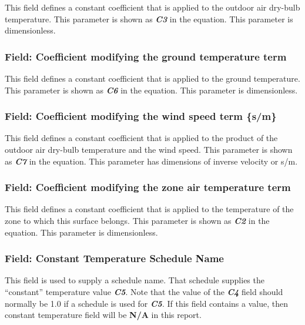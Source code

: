 This field defines a constant coefficient that is applied to the outdoor air dry-bulb temperature. This parameter is shown as \textbf{\emph{C3}} in the equation. This parameter is dimensionless.

\subsubsection{Field: Coefficient modifying the ground temperature term}\label{field-coefficient-modifying-the-ground-temperature-term}

This field defines a constant coefficient that is applied to the ground temperature. This parameter is shown as \textbf{\emph{C6}} in the equation. This parameter is dimensionless.

\subsubsection{Field: Coefficient modifying the wind speed term \{s/m\}}\label{field-coefficient-modifying-the-wind-speed-term-sm}

This field defines a constant coefficient that is applied to the product of the outdoor air dry-bulb temperature and the wind speed. This parameter is shown as \textbf{\emph{C7}} in the equation. This parameter has dimensions of inverse velocity or s/m.

\subsubsection{Field: Coefficient modifying the zone air temperature term}\label{field-coefficient-modifying-the-zone-air-temperature-term}

This field defines a constant coefficient that is applied to the temperature of the zone to which this surface belongs. This parameter is shown as \textbf{\emph{C2}} in the equation. This parameter is dimensionless.

\subsubsection{Field: Constant Temperature Schedule Name}\label{field-constant-temperature-schedule-name}

This field is used to supply a schedule name. That schedule supplies the ``constant'' temperature value \textbf{\emph{C5}}. Note that the value of the \textbf{\emph{C4}} field should normally be 1.0 if a schedule is used for \textbf{\emph{C5}}. If this field contains a value, then constant temperature field will be \textbf{N/A} in this report.


